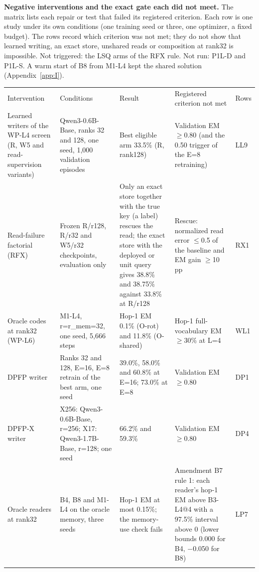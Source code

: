 
\textbf{Negative interventions and the exact gate each did not meet.} The matrix lists each repair or test that failed its registered criterion. Each
row is one study under its own conditions (one training seed or three, one optimizer, a fixed budget). The rows record which criterion was not met;
they do not show that learned writing, an exact store, unshared reads or composition at rank32 is impossible. Not triggered: the LSQ arms of the RFX rule. Not run: P1L-D and P1L-S. A warm start of B8 from M1-L4 kept the shared solution (Appendix~\ref{app:I}).


{\footnotesize
\setlength{\tabcolsep}{3pt}
\begin{longtable}{W{132}{10}W{253}{10}W{264}{10}W{287}{10}W{64}{10}}
\toprule
Intervention & Conditions & Result & Registered criterion not met & Rows \\ \addlinespace[3pt]
\midrule \endhead
Learned writers of the WP-L4 screen (R, W5 and read-supervision variants) & Qwen3-0.6B-Base, ranks 32 and 128, one seed, 1,000 validation episodes & Best eligible arm 33.5\% (R, rank128) & Validation EM \ensuremath{\geq}0.80 (and the 0.50 trigger of the E=8 retraining) & LL9 \\ \addlinespace[3pt]
Read-failure factorial (RFX) & Frozen R/\allowbreak{}r128, R/\allowbreak{}r32 and W5/\allowbreak{}r32 checkpoints, evaluation only & Only an exact store together with the true key (a label) rescues the read; the exact store with the deployed or unit query gives 38.8\% and 38.75\% against 33.8\% at R/\allowbreak{}r128 & Rescue: normalized read error \ensuremath{\leq}0.5 of the baseline and EM gain \ensuremath{\geq}10 pp & RX1 \\ \addlinespace[3pt]
Oracle codes at rank32 (WP-L6) & M1-L4, r=r\_mem=32, one seed, 5,666 steps & Hop-1 EM 0.1\% (O-rot) and 11.8\% (O-shared) & Hop-1 full-vocabulary EM \ensuremath{\geq}30\% at L=4 & WL1 \\ \addlinespace[3pt]
DPFP writer & Ranks 32 and 128, E=16, E=8 retrain of the best arm, one seed & 39.0\%, 58.0\% and 60.8\% at E=16; 73.0\% at E=8 & Validation EM \ensuremath{\geq}0.80 & DP1 \\ \addlinespace[3pt]
DPFP-X writer & X256: Qwen3-0.6B-Base, r=256; X17: Qwen3-1.7B-Base, r=128; one seed & 66.2\% and 59.3\% & Validation EM \ensuremath{\geq}0.80 & DP4 \\ \addlinespace[3pt]
Oracle readers at rank32 & B4, B8 and M1-L4 on the oracle memory, three seeds & Hop-1 EM at most 0.15\%; the memory-use check fails & Amendment B7 rule 1: each reader’s hop-1 EM above B3-L4@4 with a 97.5\% interval above 0 (lower bounds 0.000 for B4, \ensuremath{-}0.050 for B8) & LP7 \\ \addlinespace[3pt]

\end{longtable}}
